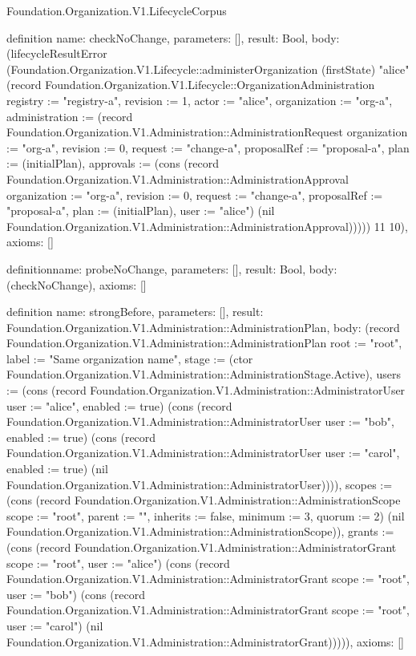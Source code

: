\begin{lexlean}{Foundation.Organization.V1.LifecycleCorpus}
\begin{semanticmodule}
definition{
  name: checkNoChange,
  parameters: [],
  result: Bool,
  body: (lifecycleResultError (Foundation.Organization.V1.Lifecycle::administerOrganization (firstState) "alice" (record Foundation.Organization.V1.Lifecycle::OrganizationAdministration {registry := "registry-a", revision := 1, actor := "alice", organization := "org-a", administration := (record Foundation.Organization.V1.Administration::AdministrationRequest {organization := "org-a", revision := 0, request := "change-a", proposalRef := "proposal-a", plan := (initialPlan), approvals := (cons (record Foundation.Organization.V1.Administration::AdministrationApproval {organization := "org-a", revision := 0, request := "change-a", proposalRef := "proposal-a", plan := (initialPlan), user := "alice"}) (nil Foundation.Organization.V1.Administration::AdministrationApproval))})})) 11 10),
  axioms: []
}

definition{name: probeNoChange, parameters: [], result: Bool, body: (checkNoChange), axioms: []}

definition{
  name: strongBefore,
  parameters: [],
  result: Foundation.Organization.V1.Administration::AdministrationPlan,
  body: (record Foundation.Organization.V1.Administration::AdministrationPlan {root := "root", label := "Same organization name", stage := (ctor Foundation.Organization.V1.Administration::AdministrationStage.Active), users := (cons (record Foundation.Organization.V1.Administration::AdministratorUser {user := "alice", enabled := true}) (cons (record Foundation.Organization.V1.Administration::AdministratorUser {user := "bob", enabled := true}) (cons (record Foundation.Organization.V1.Administration::AdministratorUser {user := "carol", enabled := true}) (nil Foundation.Organization.V1.Administration::AdministratorUser)))), scopes := (cons (record Foundation.Organization.V1.Administration::AdministrationScope {scope := "root", parent := "", inherits := false, minimum := 3, quorum := 2}) (nil Foundation.Organization.V1.Administration::AdministrationScope)), grants := (cons (record Foundation.Organization.V1.Administration::AdministratorGrant {scope := "root", user := "alice"}) (cons (record Foundation.Organization.V1.Administration::AdministratorGrant {scope := "root", user := "bob"}) (cons (record Foundation.Organization.V1.Administration::AdministratorGrant {scope := "root", user := "carol"}) (nil Foundation.Organization.V1.Administration::AdministratorGrant))))}),
  axioms: []
}


\end{semanticmodule}
\end{lexlean}
